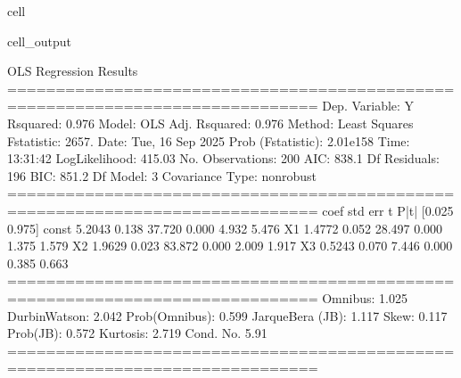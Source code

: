 \documentclass[letterpaper,10pt,english]{jupyterBook}
\begin{document}
\begin{sphinxuseclass}{cell}
\begin{sphinxVerbatimOutput}
\begin{sphinxuseclass}{cell_output}
\begin{sphinxVerbatim}[commandchars=\\\{\}]
                            OLS Regression Results                            
==============================================================================
Dep. Variable:                      Y   R\PYGZhy{}squared:                       0.976
Model:                            OLS   Adj. R\PYGZhy{}squared:                  0.976
Method:                 Least Squares   F\PYGZhy{}statistic:                     2657.
Date:                Tue, 16 Sep 2025   Prob (F\PYGZhy{}statistic):          2.01e\PYGZhy{}158
Time:                        13:31:42   Log\PYGZhy{}Likelihood:                \PYGZhy{}415.03
No. Observations:                 200   AIC:                             838.1
Df Residuals:                     196   BIC:                             851.2
Df Model:                           3                                         
Covariance Type:            nonrobust                                         
==============================================================================
                 coef    std err          t      P\PYGZgt{}|t|      [0.025      0.975]
\PYGZhy{}\PYGZhy{}\PYGZhy{}\PYGZhy{}\PYGZhy{}\PYGZhy{}\PYGZhy{}\PYGZhy{}\PYGZhy{}\PYGZhy{}\PYGZhy{}\PYGZhy{}\PYGZhy{}\PYGZhy{}\PYGZhy{}\PYGZhy{}\PYGZhy{}\PYGZhy{}\PYGZhy{}\PYGZhy{}\PYGZhy{}\PYGZhy{}\PYGZhy{}\PYGZhy{}\PYGZhy{}\PYGZhy{}\PYGZhy{}\PYGZhy{}\PYGZhy{}\PYGZhy{}\PYGZhy{}\PYGZhy{}\PYGZhy{}\PYGZhy{}\PYGZhy{}\PYGZhy{}\PYGZhy{}\PYGZhy{}\PYGZhy{}\PYGZhy{}\PYGZhy{}\PYGZhy{}\PYGZhy{}\PYGZhy{}\PYGZhy{}\PYGZhy{}\PYGZhy{}\PYGZhy{}\PYGZhy{}\PYGZhy{}\PYGZhy{}\PYGZhy{}\PYGZhy{}\PYGZhy{}\PYGZhy{}\PYGZhy{}\PYGZhy{}\PYGZhy{}\PYGZhy{}\PYGZhy{}\PYGZhy{}\PYGZhy{}\PYGZhy{}\PYGZhy{}\PYGZhy{}\PYGZhy{}\PYGZhy{}\PYGZhy{}\PYGZhy{}\PYGZhy{}\PYGZhy{}\PYGZhy{}\PYGZhy{}\PYGZhy{}\PYGZhy{}\PYGZhy{}\PYGZhy{}\PYGZhy{}
const          5.2043      0.138     37.720      0.000       4.932       5.476
X1             1.4772      0.052     28.497      0.000       1.375       1.579
X2            \PYGZhy{}1.9629      0.023    \PYGZhy{}83.872      0.000      \PYGZhy{}2.009      \PYGZhy{}1.917
X3             0.5243      0.070      7.446      0.000       0.385       0.663
==============================================================================
Omnibus:                        1.025   Durbin\PYGZhy{}Watson:                   2.042
Prob(Omnibus):                  0.599   Jarque\PYGZhy{}Bera (JB):                1.117
Skew:                          \PYGZhy{}0.117   Prob(JB):                        0.572
Kurtosis:                       2.719   Cond. No.                         5.91
==============================================================================


\end{sphinxVerbatim}
\end{sphinxuseclass}
\end{sphinxVerbatimOutput}
\end{sphinxuseclass}
\end{document}
